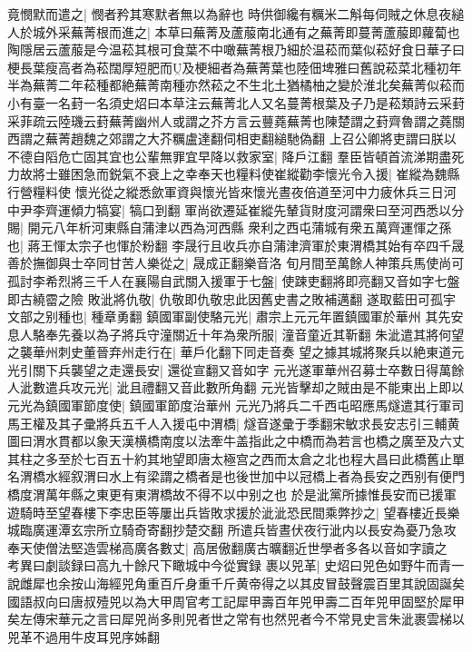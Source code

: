 竟憫默而遣之|{
	憫者矜其寒默者無以為辭也}
時供御纔有糲米二斛每伺賊之休息夜縋人於城外采蕪菁根而進之|{
	本草曰蕪菁及蘆菔南北通有之蕪菁即蔓菁蘆菔即蘿蔔也陶隱居云蘆菔是今温菘其根可食葉不中噉蕪菁根乃細於温菘而葉似菘好食日華子曰梗長葉瘦高者為菘闊厚短肥而及梗細者為蕪菁葉也陸佃埤雅曰舊說菘菜北種初年半為蕪菁二年菘種都絶蕪菁南種亦然菘之不生北土猶橘柚之變於淮北矣蕪菁似菘而小有臺一名葑一名須史炤曰本草注云蕪菁北人又名蔓菁根葉及子乃是菘類詩云采葑采菲疏云陸璣云葑蕪菁幽州人或謂之芥方言云蘴蕘蕪菁也陳楚謂之葑齊魯謂之蕘關西謂之蕪菁趙魏之郊謂之大芥糲盧達翻伺相吏翻縋馳偽翻}
上召公卿將吏謂曰朕以不德自䧟危亡固其宜也公輩無罪宜早降以救家室|{
	降戶江翻}
羣臣皆頓首流涕期盡死力故將士雖困急而鋭氣不衰上之幸奉天也糧料使崔縱勸李懷光令入援|{
	崔縱為魏縣行營糧料使}
懷光從之縱悉歛軍資與懷光皆來懷光晝夜倍道至河中力疲休兵三日河中尹李齊運傾力犒宴|{
	犒口到翻}
軍尚欲遷延崔縱先輦貨財度河謂衆曰至河西悉以分賜|{
	開元八年析河東縣自蒲津以西為河西縣}
衆利之西屯蒲城有衆五萬齊運惲之孫也|{
	蔣王惲太宗子也惲於粉翻}
李晟行且收兵亦自蒲津濟軍於東渭橋其始有卒四千晟善於撫御與士卒同甘苦人樂從之|{
	晟成正翻樂音洛}
旬月間至萬餘人神策兵馬使尚可孤討李希烈將三千人在襄陽自武關入援軍于七盤|{
	使踈吏翻將即亮翻又音如字七盤即古繞霤之險}
敗泚將仇敬|{
	仇敬即仇敬忠此因舊史書之敗補邁翻}
遂取藍田可孤宇文部之别種也|{
	種章勇翻}
鎮國軍副使駱元光|{
	肅宗上元元年置鎮國軍於華州}
其先安息人駱奉先養以為子將兵守潼關近十年為衆所服|{
	潼音童近其靳翻}
朱泚遣其將何望之襲華州刺史董晉弃州走行在|{
	華戶化翻下同走音奏}
望之據其城將聚兵以絶東道元光引關下兵襲望之走還長安|{
	還從宣翻又音如字}
元光遂軍華州召募士卒數日得萬餘人泚數遣兵攻元光|{
	泚且禮翻又音此數所角翻}
元光皆擊却之賊由是不能東出上即以元光為鎮國軍節度使|{
	鎮國軍節度治華州}
元光乃將兵二千西屯昭應馬燧遣其行軍司馬王權及其子彚將兵五千人入援屯中渭橋|{
	燧音遂彚于季翻宋敏求長安志引三輔黄圖曰渭水貫都以象天漢横橋南度以法牽牛盖指此之中橋而為若言也橋之廣至及六丈其柱之多至於七百五十約其地望即唐太極宫之西而太倉之北也程大昌曰此橋舊止單名渭橋水經叙渭曰水上有梁謂之橋者是也後世加中以冠橋上者為長安之西别有便門橋度渭萬年縣之東更有東渭橋故不得不以中别之也}
於是泚黨所據惟長安而已援軍遊騎時至望春樓下李忠臣等屢出兵皆敗求援於泚泚恐民間乘弊抄之|{
	望春樓近長樂城臨廣運潭玄宗所立騎奇寄翻抄楚交翻}
所遣兵皆晝伏夜行泚内以長安為憂乃急攻奉天使僧法堅造雲梯高廣各數丈|{
	高居傲翻廣古曠翻近世學者多各以音如字讀之　考異曰劇談録曰高九十餘尺下瞰城中今從實録}
裹以兕革|{
	史炤曰兕色如野牛而青一說雌犀也余按山海經兕角重百斤身重千斤黄帝得之以其皮冒鼓聲震百里其說固誕矣國語叔向曰唐叔殪兕以為大甲周官考工記犀甲壽百年兕甲壽二百年兕甲固堅於犀甲矣左傳宋華元之言曰犀兕尚多則兕者世之常有也然兕者今不常見史言朱泚裹雲梯以兕革不過用牛皮耳兕序姊翻}
